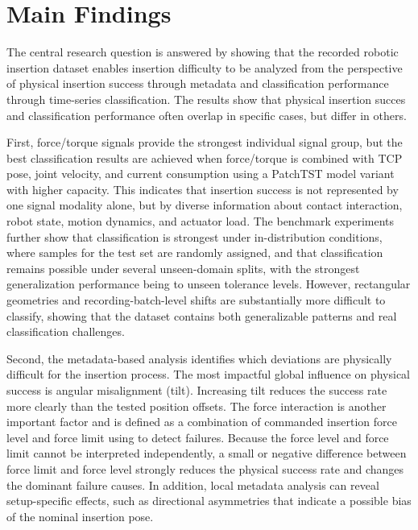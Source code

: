 \section{Main Findings}
\label{sec}

The central research question is answered by showing that the recorded robotic insertion dataset enables insertion difficulty to be analyzed from the perspective of physical insertion success through metadata and classification performance through time-series classification. The results show that physical insertion succes and classification performance often overlap in specific cases, but differ in others.

First, force/torque signals provide the strongest individual signal group, but the best classification results are achieved when force/torque is combined with TCP pose, joint velocity, and current consumption using a PatchTST model variant with higher capacity. This indicates that insertion success is not represented by one signal modality alone, but by diverse information about contact interaction, robot state, motion dynamics, and actuator load. The benchmark experiments further show that classification is strongest under in-distribution conditions, where samples for the test set are randomly assigned, and that classification remains possible under several unseen-domain splits, with the strongest generalization performance being to unseen tolerance levels. However, rectangular geometries and recording-batch-level shifts are substantially more difficult to classify, showing that the dataset contains both generalizable patterns and real classification challenges.

Second, the metadata-based analysis identifies which deviations are physically difficult for the insertion process. The most impactful global influence on physical success is angular misalignment (tilt). Increasing tilt reduces the success rate more clearly than the tested position offsets. The force interaction is another important factor and is defined as a combination of commanded insertion force level and force limit using to detect failures. Because the force level and force limit cannot be interpreted independently, a small or negative difference between force limit and force level strongly reduces the physical success rate and changes the dominant failure causes. In addition, local metadata analysis can reveal setup-specific effects, such as directional asymmetries that indicate a possible bias of the nominal insertion pose.

